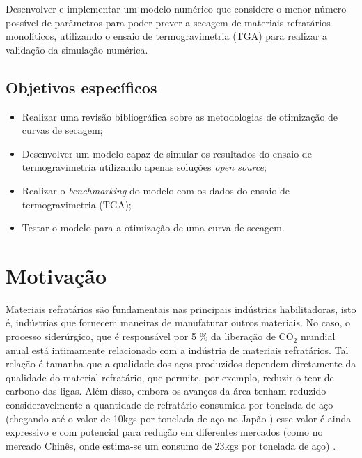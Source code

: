     Desenvolver e implementar um modelo numérico que considere o menor número
    possível de parâmetros para poder prever a secagem de materiais refratários
    monolíticos, utilizando o ensaio de termogravimetria (TGA) para realizar a
    validação da simulação numérica.
        
    \subsection{Objetivos específicos}
        
    \begin{itemize}
    \item Realizar uma revisão bibliográfica sobre as metodologias de otimização
      de curvas de secagem;
        
    \item Desenvolver um modelo capaz de simular os resultados do ensaio de
      termogravimetria utilizando apenas soluções \textit{open source};
        
    \item Realizar o \textit{benchmarking} do modelo com os dados do ensaio de
      termogravimetria (TGA);
        
    \item Testar o modelo para a otimização de uma curva de secagem.
    \end{itemize}
        
\section{Motivação}
Materiais refratários são fundamentais nas principais indústrias habilitadoras,
isto é, indústrias que fornecem maneiras de manufaturar outros materiais. No
caso, o processo siderúrgico, que é responsável por 5 \% \cite{Davis2018} da
liberação de CO$_2$ mundial anual está intimamente relacionado com a indústria
de materiais refratários. Tal relação é tamanha que a qualidade dos aços
produzidos dependem diretamente da qualidade do material refratário, que
permite, por exemplo, reduzir o teor de carbono das ligas. Além disso, embora os
avanços da área tenham reduzido consideravelmente a quantidade de refratário
consumida por tonelada de aço (chegando até o valor de 10kgs por tonelada de aço
no Japão \cite{Report2003}) esse valor é ainda expressivo e com potencial para redução em
diferentes mercados (como no mercado Chinês, onde estima-se um consumo de 23kgs
por tonelada de aço) \cite{refperton}.


